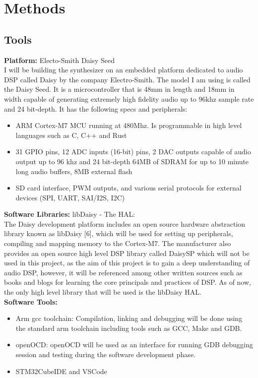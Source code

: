 \documentclass[12pt]{article}
\begin{document}
\section{Methods}
\subsection{Tools}

\textbf{Platform:} Electo-Smith Daisy Seed\\
I will be building the synthesizer on an embedded platform dedicated to
audio DSP called Daisy by the company Electro-Smith. The model I am using is called the Daisy Seed. It is a microcontroller that is 48mm in length and 18mm in width capable of generating extremely high fidelity audio up to 96khz sample rate and 24 bit-depth. It has the following specs and peripherals:

\begin{itemize}
    \item ARM Cortex-M7 MCU running at 480Mhz. Is programmable in high level languages such as C, C++ and Rust
    \item 31 GPIO pins, 12 ADC inputs (16-bit) pins, 2 DAC outputs capable of audio output up to 96 khz and 24 bit-depth
    64MB of SDRAM for up to 10 minute long audio buffers, 8MB external flash
    \item SD card interface, PWM outputs, and various serial protocols for external devices (SPI, UART, SAI/I2S, I2C)
\end{itemize}

\textbf{Software Libraries:}
libDaisy - The HAL:\\
The Daisy development platform includes an open source hardware abstraction library known as libDaisy [6], which will be used for setting up peripherals, compiling and mapping memory to the Cortex-M7\cite{electro-smith}. The manufacturer also provides an open source high level DSP library called DaisySP which will not be used in this project, as the aim of this project is to gain a deep understanding of audio DSP, however, it will be referenced among other written sources such as books and blogs for learning the core principals and practices of DSP. As of now, the only high level library that will be used is the libDaisy HAL.
\\

\textbf{Software Tools:}
\begin{itemize}
    \item Arm gcc toolchain: Compilation, linking and debugging will be done using the standard arm toolchain including tools such as GCC, Make and GDB.
    \item openOCD: openOCD will be used as an interface for running GDB debugging session and testing during the software development phase.
    \item STM32CubeIDE and VSCode
\end{itemize}
    
\end{document}
